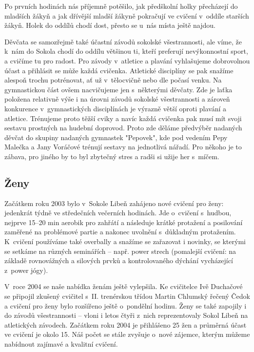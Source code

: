 \documentclass[a5paper, 11pt, twoside]{article}
\begin{document}
Po prvních hodinách nás příjemně potěšilo, jak předškolní holky
přecházejí do mladších žákyň a jak dřívější mladší žákyně pokračují ve
cvičení v~oddíle starších žákyň. Holek do oddílů chodí dost, přesto se
u~nás místa ještě najdou.

Děvčata se samozřejmě také účastní závodů sokolské všestrannosti, ale
víme, že k~nám do Sokola chodí do oddílu většinou ti, kteří preferují
nevýkonnostní sport, a cvičíme tu pro radost. Pro závody v~atletice a
plavání vyhlašujeme dobrovolnou účast a přihlásit se může každá
cvičenka. Atletické disciplíny se pak snažíme alespoň trochu potrénovat,
ať už v~tělocvičně nebo dle počasí venku. Na gymnastickou část ovšem
nacvičujeme jen s~některými děvčaty. Zde je laťka položena relativně
výše i na úrovni závodů sokolské všestrannosti a zároveň konkurence
v~gymnastických disciplínách je výrazně větší oproti plavání a atletice.
Trénujeme proto těžší cviky a navíc každá cvičenka pak musí mít svoji
sestavu prostných na hudební doprovod. Proto zde děláme předvýběr
nadaných děvčat do skupiny nadaných gymnastek "Pepovek", kde pod
vedením Pepy Malečka a Jany Voráčové trénují sestavy na jednotlivá
nářadí. Pro někoho je to zábava, pro jiného by to byl zbytečný stres a
radši si užije her s~míčem.

\vspace{\fill}

\subsection{Ženy}

Začátkem roku 2003 bylo v~Sokole Libeň zahájeno nové cvičení pro ženy:
jedenkrát týdně ve středečních večerních hodinách. Jde o~cvičení
s~hudbou, nejprve 15--20 min aerobik pro zahřátí a následuje krátké
protažení a posilování zaměřené na problémové partie a nakonec uvolnění
s~důkladným protažením. K~cvičení používáme také overbally a snažíme se
zařazovat i novinky, se kterými se setkáme na různých seminářích --
např. power strech (pomalejší cvičení: na základě rovnovážných a
silových prvků a kontrolovaného dýchání vycházející z~power jógy).

V~roce 2004 se naše nabídka ženám ještě vylepšila. Ke cvičitelce Ivě
Duchačové se připojil zkušený cvičitel s~II. trenérskou třídou Martin
Chlumský řečený Čedok a cvičení pro ženy bylo rozšířeno ještě o~pondělní
hodinu. Ženy se také zapojily i do závodů všestrannosti -- vloni i letos
čtyři z~nich reprezentovaly Sokol Libeň na atletických závodech.
Začátkem roku 2004 je přihlášeno 25 žen a průměrná účast ve cvičení je
okolo 15. Náš počet se stále zvyšuje o~nové zájemce, kterým můžeme
nabídnout zajímavé a kvalitní cvičení.
\end{document}
